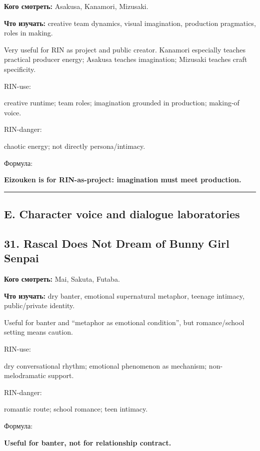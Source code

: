 \textbf{Кого смотреть:} Asakusa, Kanamori, Mizusaki.

\textbf{Что изучать:} creative team dynamics, visual imagination,
production pragmatics, roles in making.

Very useful for RIN as project and public creator. Kanamori especially
teaches practical producer energy; Asakusa teaches imagination; Mizusaki
teaches craft specificity.

RIN-use:

creative runtime; team roles; imagination grounded in production;
making-of voice.

RIN-danger:

chaotic energy; not directly persona/\hspace{0pt}intimacy.

Формула:

\textbf{Eizouken is for RIN-as-project: imagination must meet
production.}

\begin{center}\rule{0.5\linewidth}{0.5pt}\end{center}

\subsection*{E. Character voice and dialogue laboratories}

\subsection*{31. Rascal Does Not Dream of Bunny Girl Senpai}

\textbf{Кого смотреть:} Mai, Sakuta, Futaba.

\textbf{Что изучать:} dry banter, emotional supernatural metaphor,
teenage intimacy, public/\hspace{0pt}private identity.

Useful for banter and ``metaphor as emotional condition'', but
romance/\hspace{0pt}school setting means caution.

RIN-use:

dry conversational rhythm; emotional phenomenon as mechanism;
non-melodramatic support.

RIN-danger:

romantic route; school romance; teen intimacy.

Формула:

\textbf{Useful for banter, not for relationship contract.}

